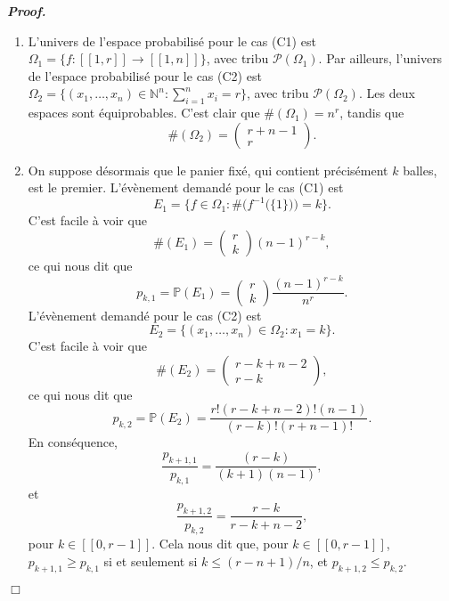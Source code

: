 \documentclass[11pt,a4paper]{article}
\newcommand{\NN}{\mathbb{N}}
\newenvironment{preuve}[1][]
{\vskip 2mm  \noindent\emph{\bf Proof#1. }}{$\Box$ \vskip 2mm}
\let\geq\geqslant
\let\leq\leqslant
\begin{document}
		\begin{preuve}
			\begin{enumerate}
				\item L'univers de l'espace probabilisé pour le cas (C1) est $\Omega_{1} = \{ f : [\![ 1, r ]\!] \rightarrow [\![ 1, n ]\!] \}$, avec tribu $\mathscr{P}(\Omega_{1})$. 
				Par ailleurs, l'univers de l'espace probabilisé pour le cas (C2) est $\Omega_{2} = \{ (x_{1}, \dots, x_{n}) \in \NN^{n} : \sum_{i=1}^{n} x_{i} = r \}$, avec tribu $\mathscr{P}(\Omega_{2})$. 
				Les deux espaces sont équiprobables. 
				C'est clair que $\#(\Omega_{1}) = n^{r}$, tandis que 
				\[     \#(\Omega_{2}) = \begin{pmatrix} r+n-1 \\ r \end{pmatrix}.     \] 
				
				\item On suppose désormais que le panier fixé, qui contient précisément $k$ balles, est le premier. 
				L'évènement demandé pour le cas (C1) est 
				\[     E_{1} = \bigg\{ f \in \Omega_{1} : \#\Big(f^{-1}\big(\{1\}\big)\Big)= k  \bigg\}.     \]
				C'est facile à voir que 
				\[     \#(E_{1}) = \begin{pmatrix} r \\ k \end{pmatrix} (n-1)^{r-k},      \]
				ce qui nous dit que 
				\[     p_{k,1} = \mathbb{P}(E_{1}) = \begin{pmatrix} r \\ k \end{pmatrix} \frac{(n-1)^{r-k}}{n^{r}}.      \]
				L'évènement demandé pour le cas (C2) est 
				\[     E_{2} = \big\{ (x_{1}, \dots, x_{n}) \in \Omega_{2} : x_{1}= k  \big\}.     \]
				C'est facile à voir que 
				\[     \#(E_{2}) = \begin{pmatrix} r-k+n-2 \\ r-k \end{pmatrix},      \]
				ce qui nous dit que 
				\[     p_{k,2} = \mathbb{P}(E_{2}) = \frac{r! (r-k+n-2)!  (n-1)}{(r-k)! (r+n-1)!}.      \]
				En conséquence,  
				\[     \frac{p_{k+1,1}}{p_{k,1}} = \frac{(r-k)}{(k+1) (n-1)},     \]
				et 
				\[     \frac{p_{k+1,2}}{p_{k,2}} = \frac{r-k}{r-k+n-2},     \]
				pour $k \in [\![ 0, r-1 ]\!]$.
				Cela nous dit que, pour $k \in [\![ 0, r-1 ]\!]$, $p_{k+1,1} \geq p_{k,1}$ si et seulement si $k \leq (r-n+1)/n$, et 
				$p_{k+1,2} \leq p_{k,2}$.
				

\end{enumerate}
\end{preuve}
\end{document}
